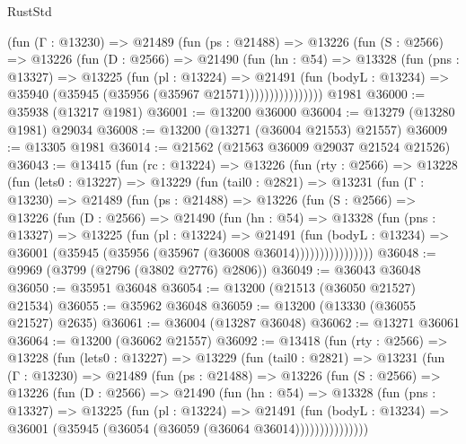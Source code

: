 \begin{lexlean}{RustStd}
\begin{coremodule}
              (fun (Γ : @13230) =>
              @21489
                (fun (ps : @21488) =>
                @13226
                  (fun (S : @2566) =>
                  @13226
                    (fun (D : @2566) =>
                    @21490
                      (fun (hn : @54) =>
                      @13328
                        (fun (pns : @13327) =>
                        @13225
                          (fun (pl : @13224) =>
                          @21491
                            (fun (bodyL : @13234) =>
                            @35940 (@35945 (@35956 (@35967 @21571))))))))))))))))
    @1981
@36000 := @35938 (@13217 @1981)
@36001 := @13200 @36000
@36004 := @13279 (@13280 @1981) @29034
@36008 := @13200 (@13271 (@36004 @21553) @21557)
@36009 := @13305 @1981
@36014 := @21562 (@21563 @36009 @29037 @21524 @21526)
@36043 := @13415
    (fun (rc : @13224) =>
    @13226
      (fun (rty : @2566) =>
      @13228
        (fun (lets0 : @13227) =>
        @13229
          (fun (tail0 : @2821) =>
          @13231
            (fun (Γ : @13230) =>
            @21489
              (fun (ps : @21488) =>
              @13226
                (fun (S : @2566) =>
                @13226
                  (fun (D : @2566) =>
                  @21490
                    (fun (hn : @54) =>
                    @13328
                      (fun (pns : @13327) =>
                      @13225
                        (fun (pl : @13224) =>
                        @21491
                          (fun (bodyL : @13234) =>
                          @36001 (@35945 (@35956 (@35967 (@36008 @36014))))))))))))))))
@36048 := @9969 (@3799 (@2796 (@3802 @2776) @2806))
@36049 := @36043 @36048
@36050 := @35951 @36048
@36054 := @13200 (@21513 (@36050 @21527) @21534)
@36055 := @35962 @36048
@36059 := @13200 (@13330 (@36055 @21527) @2635)
@36061 := @36004 (@13287 @36048)
@36062 := @13271 @36061
@36064 := @13200 (@36062 @21557)
@36092 := @13418
    (fun (rty : @2566) =>
    @13228
      (fun (lets0 : @13227) =>
      @13229
        (fun (tail0 : @2821) =>
        @13231
          (fun (Γ : @13230) =>
          @21489
            (fun (ps : @21488) =>
            @13226
              (fun (S : @2566) =>
              @13226
                (fun (D : @2566) =>
                @21490
                  (fun (hn : @54) =>
                  @13328
                    (fun (pns : @13327) =>
                    @13225
                      (fun (pl : @13224) =>
                      @21491
                        (fun (bodyL : @13234) =>
                        @36001 (@35945 (@36054 (@36059 (@36064 @36014)))))))))))))))

\end{coremodule}
\end{lexlean}
